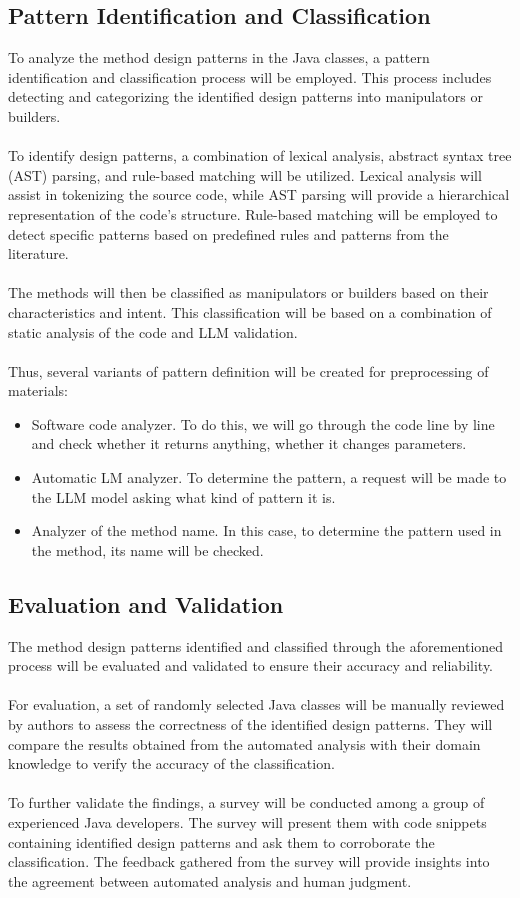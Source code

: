 \documentclass[draft]{article}
\begin{document}
\subsection{Pattern Identification and Classification}
To analyze the method design patterns in the Java classes, a pattern identification and classification process will be employed. This process includes detecting and categorizing the identified design patterns into manipulators or builders.\\
~\\
To identify design patterns, a combination of lexical analysis, abstract syntax tree (AST) parsing, and rule-based matching will be utilized. Lexical analysis will assist in tokenizing the source code, while AST parsing will provide a hierarchical representation of the code's structure. Rule-based matching will be employed to detect specific patterns based on predefined rules and patterns from the literature.\\
~\\
The methods will then be classified as manipulators or builders based on their characteristics and intent. This classification will be based on a combination of static analysis of the code and LLM validation.\\
~\\
Thus, several variants of pattern definition will be created for preprocessing of materials:
\begin{itemize}
  \item Software code analyzer. To do this, we will go through the code line by line and check whether it returns anything, whether it changes parameters.
  \item Automatic LM analyzer. To determine the pattern, a request will be made to the LLM model asking what kind of pattern it is.
  \item Analyzer of the method name. In this case, to determine the pattern used in the method, its name will be checked.
\end{itemize}
\subsection{Evaluation and Validation}
The method design patterns identified and classified through the aforementioned process will be evaluated and validated to ensure their accuracy and reliability.\\
~\\
For evaluation, a set of randomly selected Java classes will be manually reviewed by authors to assess the correctness of the identified design patterns. They will compare the results obtained from the automated analysis with their domain knowledge to verify the accuracy of the classification.\\
~\\
To further validate the findings, a survey will be conducted among a group of experienced Java developers. The survey will present them with code snippets containing identified design patterns and ask them to corroborate the classification. The feedback gathered from the survey will provide insights into the agreement between automated analysis and human judgment.
\end{document}
